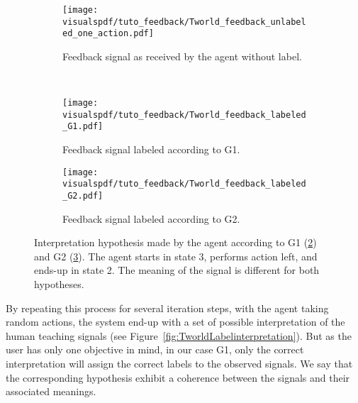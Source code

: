 \begin{figure}[!htbp]
    \centering
    \begin{subfigure}[b]{\tworldsize\columnwidth}
        \centering
        \texttt{[image: \\visualspdf/tuto\_feedback/Tworld\_feedback\_unlabeled\_one\_action.pdf]}
        \caption{Feedback signal as received by the agent without label.}
        \label{fig:TworldLabelunknown}
    \end{subfigure}\\
    \begin{subfigure}[b]{\tworldsize\columnwidth}
        \centering
        \texttt{[image: \\visualspdf/tuto\_feedback/Tworld\_feedback\_labeled\_G1.pdf]}
        \caption{Feedback signal labeled according to G1.}
        \label{fig:TworldLabelG1}
    \end{subfigure}
    \begin{subfigure}[b]{\tworldsize\columnwidth}
        \centering
        \texttt{[image: \\visualspdf/tuto\_feedback/Tworld\_feedback\_labeled\_G2.pdf]}
        \caption{Feedback signal labeled according to G2.}
        \label{fig:TworldLabelG2}
    \end{subfigure}
    \caption{Interpretation hypothesis made by the agent according to G1 (\ref{fig:TworldLabelG1}) and G2 (\ref{fig:TworldLabelG2}). The agent starts in state 3, performs action left, and ends-up in state 2. The meaning of the signal is different for both hypotheses.}
    \label{fig:TworldLabelOneStep}
\end{figure}

By repeating this process for several iteration steps, with the agent taking random actions, the system end-up with a set of possible interpretation of the human teaching signals (see Figure~\ref{fig:TworldLabelinterpretation}). But as the user has only one objective in mind, in our case G1, only the correct interpretation will assign the correct labels to the observed signals. We say that the corresponding hypothesis exhibit a coherence between the signals and their associated meanings. 


        
